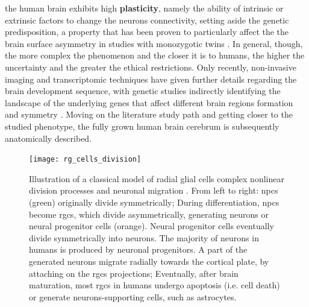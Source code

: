 the human brain exhibits high \textbf{plasticity}, namely the ability of intrinsic or extrinsic factors to change the neurons connectivity, setting aside the genetic predisposition, a property that has been proven to particularly affect the the brain surface asymmetry in studies with monozygotic twins \cite{White2002,Manzano2018}. In general, though, the more complex the phenomenon and the closer it is to humans, the higher the uncertainty and the greater the ethical restrictions. Only recently, non-invasive imaging and transcriptomic techniques have given further details regarding the brain development sequence, with genetic studies indirectly identifying the landscape of the underlying genes that affect different brain regions formation and symmetry \cite{Cara2022}. Moving on the literature study path and getting closer to the studied phenotype, the fully grown human brain cerebrum is subsequently anatomically described.

\begin{figure}[H]
	\centering
	\texttt{[image: rg\_cells\_division]}\\
	\caption[A classical model of radial glial cells division processes \cite{Rakic2009}]{Illustration of a classical model of radial glial cells complex nonlinear division processes and neuronal migration \cite{Rakic2009}. From left to right: \acsp{npc} (green) originally divide symmetrically; During differentiation, \acsp{npc} become \acsp{rgc}, which divide asymmetrically, generating neurons or neural progenitor cells (orange). Neural progenitor cells eventually divide symmetrically into neurons. The majority of neurons in humans is produced by neuronal progenitors. A part of the generated neurons migrate radially towards the cortical plate, by attaching on the \acsp{rgc} projections; Eventually, after brain maturation, most \acsp{rgc} in humans undergo apoptosis (i.e. cell death) or generate neurons-supporting cells, such as astrocytes.}
	\label{fig:rgc}
\end{figure}


